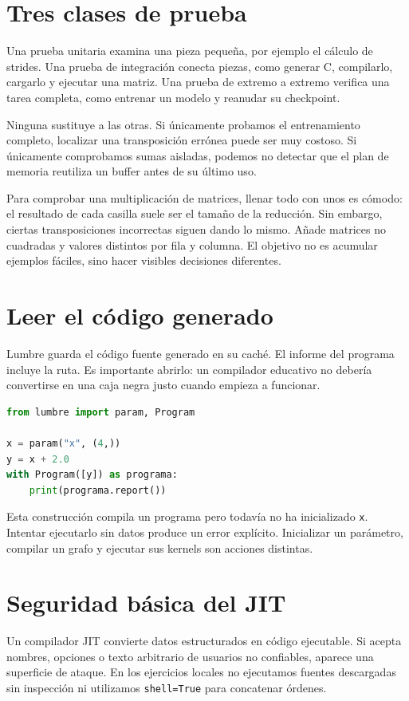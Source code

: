 \documentclass[12pt,a4paper,oneside]{report}
\begin{document}
\section{Tres clases de prueba}
Una prueba unitaria examina una pieza pequeña, por ejemplo el cálculo de strides. Una prueba de integración conecta piezas, como generar C, compilarlo, cargarlo y ejecutar una matriz. Una prueba de extremo a extremo verifica una tarea completa, como entrenar un modelo y reanudar su checkpoint.

Ninguna sustituye a las otras. Si únicamente probamos el entrenamiento completo, localizar una transposición errónea puede ser muy costoso. Si únicamente comprobamos sumas aisladas, podemos no detectar que el plan de memoria reutiliza un buffer antes de su último uso.

\begin{ejemplo}
Para comprobar una multiplicación de matrices, llenar todo con unos es cómodo: el resultado de cada casilla suele ser el tamaño de la reducción. Sin embargo, ciertas transposiciones incorrectas siguen dando lo mismo. Añade matrices no cuadradas y valores distintos por fila y columna. El objetivo no es acumular ejemplos fáciles, sino hacer visibles decisiones diferentes.

\end{ejemplo}
\section{Leer el código generado}
Lumbre guarda el código fuente generado en su caché. El informe del programa incluye la ruta. Es importante abrirlo: un compilador educativo no debería convertirse en una caja negra justo cuando empieza a funcionar.

\begin{lstlisting}[language=Python]
from lumbre import param, Program

x = param("x", (4,))
y = x + 2.0
with Program([y]) as programa:
    print(programa.report())
\end{lstlisting}
Esta construcción compila un programa pero todavía no ha inicializado \texttt{x}. Intentar ejecutarlo sin datos produce un error explícito. Inicializar un parámetro, compilar un grafo y ejecutar sus kernels son acciones distintas.

\section{Seguridad básica del JIT}
Un compilador JIT convierte datos estructurados en código ejecutable. Si acepta nombres, opciones o texto arbitrario de usuarios no confiables, aparece una superficie de ataque. En los ejercicios locales no ejecutamos fuentes descargadas sin inspección ni utilizamos \texttt{shell=True} para concatenar órdenes.
\end{document}
